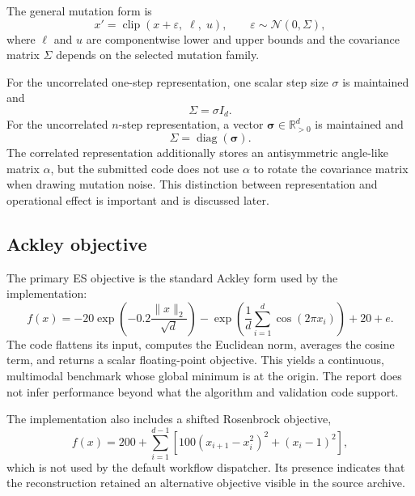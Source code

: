 \documentclass[11pt,a4paper]{article}
\newcommand{\R}{\mathbb{R}}
\begin{document}
The general mutation form is
\begin{equation}
x' = \operatorname{clip}\left(x + \varepsilon,\;\ell,\;u\right),
\qquad
\varepsilon \sim \mathcal{N}(0,\Sigma),
\end{equation}
where $\ell$ and $u$ are componentwise lower and upper bounds and the covariance matrix $\Sigma$ depends on the selected mutation family.

For the uncorrelated one-step representation, one scalar step size $\sigma$ is maintained and
\begin{equation}
\Sigma = \sigma I_d.
\end{equation}
For the uncorrelated $n$-step representation, a vector $\boldsymbol{\sigma}\in\R_{>0}^d$ is maintained and
\begin{equation}
\Sigma = \operatorname{diag}(\boldsymbol{\sigma}).
\end{equation}
The correlated representation additionally stores an antisymmetric angle-like matrix $\alpha$, but the submitted code does not use $\alpha$ to rotate the covariance matrix when drawing mutation noise. This distinction between representation and operational effect is important and is discussed later.

\subsection{Ackley objective}
The primary ES objective is the standard Ackley form used by the implementation:
\begin{equation}
f(x)= -20\exp\left(-0.2\frac{\|x\|_2}{\sqrt{d}}\right)
-\exp\left(\frac{1}{d}\sum_{i=1}^{d}\cos(2\pi x_i)\right)
+20+e.
\end{equation}
The code flattens its input, computes the Euclidean norm, averages the cosine term, and returns a scalar floating-point objective. This yields a continuous, multimodal benchmark whose global minimum is at the origin. The report does not infer performance beyond what the algorithm and validation code support.

The implementation also includes a shifted Rosenbrock objective,
\begin{equation}
f(x)=200+\sum_{i=1}^{d-1}\left[100(x_{i+1}-x_i^2)^2+(x_i-1)^2\right],
\end{equation}
which is not used by the default workflow dispatcher. Its presence indicates that the reconstruction retained an alternative objective visible in the source archive.
\end{document}
